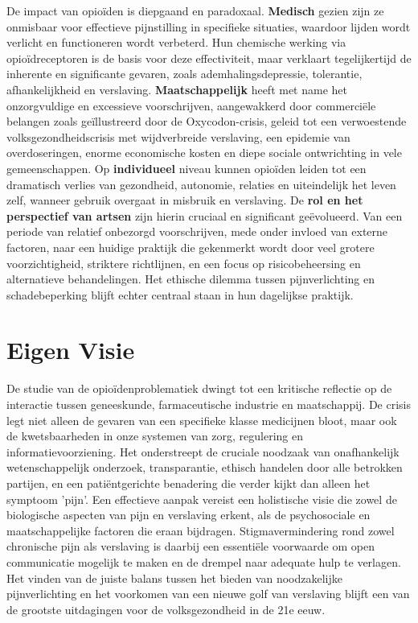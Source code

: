 \documentclass[11pt, a4paper]{report} %
\begin{document}
De impact van opioïden is diepgaand en paradoxaal.
\textbf{Medisch} gezien zijn ze onmisbaar voor effectieve pijnstilling in specifieke situaties, waardoor lijden wordt verlicht en functioneren wordt verbeterd. Hun chemische werking via opioïdreceptoren is de basis voor deze effectiviteit, maar verklaart tegelijkertijd de inherente en significante gevaren, zoals ademhalingsdepressie, tolerantie, afhankelijkheid en verslaving.
\textbf{Maatschappelijk} heeft met name het onzorgvuldige en excessieve voorschrijven, aangewakkerd door commerciële belangen zoals geïllustreerd door de Oxycodon-crisis, geleid tot een verwoestende volksgezondheidscrisis met wijdverbreide verslaving, een epidemie van overdoseringen, enorme economische kosten en diepe sociale ontwrichting in vele gemeenschappen.
Op \textbf{individueel} niveau kunnen opioïden leiden tot een dramatisch verlies van gezondheid, autonomie, relaties en uiteindelijk het leven zelf, wanneer gebruik overgaat in misbruik en verslaving.
De \textbf{rol en het perspectief van artsen} zijn hierin cruciaal en significant geëvolueerd. Van een periode van relatief onbezorgd voorschrijven, mede onder invloed van externe factoren, naar een huidige praktijk die gekenmerkt wordt door veel grotere voorzichtigheid, striktere richtlijnen, en een focus op risicobeheersing en alternatieve behandelingen. Het ethische dilemma tussen pijnverlichting en schadebeperking blijft echter centraal staan in hun dagelijkse praktijk.

\section{Eigen Visie}
De studie van de opioïdenproblematiek dwingt tot een kritische reflectie op de interactie tussen geneeskunde, farmaceutische industrie en maatschappij. De crisis legt niet alleen de gevaren van een specifieke klasse medicijnen bloot, maar ook de kwetsbaarheden in onze systemen van zorg, regulering en informatievoorziening. Het onderstreept de cruciale noodzaak van onafhankelijk wetenschappelijk onderzoek, transparantie, ethisch handelen door alle betrokken partijen, en een patiëntgerichte benadering die verder kijkt dan alleen het symptoom 'pijn'. Een effectieve aanpak vereist een holistische visie die zowel de biologische aspecten van pijn en verslaving erkent, als de psychosociale en maatschappelijke factoren die eraan bijdragen. Stigmavermindering rond zowel chronische pijn als verslaving is daarbij een essentiële voorwaarde om open communicatie mogelijk te maken en de drempel naar adequate hulp te verlagen. Het vinden van de juiste balans tussen het bieden van noodzakelijke pijnverlichting en het voorkomen van een nieuwe golf van verslaving blijft een van de grootste uitdagingen voor de volksgezondheid in de 21e eeuw.
\end{document}
